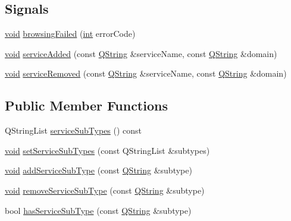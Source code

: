 \subsection*{Signals}
\begin{DoxyCompactItemize}
\item 
\hyperlink{group___u_a_v_objects_plugin_ga444cf2ff3f0ecbe028adce838d373f5c}{void} \hyperlink{class_qxt_service_browser_a64ae93186e3b3168753045325599be18}{browsing\-Failed} (\hyperlink{ioapi_8h_a787fa3cf048117ba7123753c1e74fcd6}{int} error\-Code)
\item 
\hyperlink{group___u_a_v_objects_plugin_ga444cf2ff3f0ecbe028adce838d373f5c}{void} \hyperlink{class_qxt_service_browser_a7ff617e438d9c31647c771bdcf32a6d3}{service\-Added} (const \hyperlink{group___u_a_v_objects_plugin_gab9d252f49c333c94a72f97ce3105a32d}{Q\-String} \&service\-Name, const \hyperlink{group___u_a_v_objects_plugin_gab9d252f49c333c94a72f97ce3105a32d}{Q\-String} \&domain)
\item 
\hyperlink{group___u_a_v_objects_plugin_ga444cf2ff3f0ecbe028adce838d373f5c}{void} \hyperlink{class_qxt_service_browser_a99c14f67893cd97ee134151711c56d50}{service\-Removed} (const \hyperlink{group___u_a_v_objects_plugin_gab9d252f49c333c94a72f97ce3105a32d}{Q\-String} \&service\-Name, const \hyperlink{group___u_a_v_objects_plugin_gab9d252f49c333c94a72f97ce3105a32d}{Q\-String} \&domain)
\end{DoxyCompactItemize}
\subsection*{Public Member Functions}
\begin{DoxyCompactItemize}
\item 
Q\-String\-List \hyperlink{class_qxt_service_browser_aa997db633abd90f54326fd4f1cb2764e}{service\-Sub\-Types} () const 
\item 
\hyperlink{group___u_a_v_objects_plugin_ga444cf2ff3f0ecbe028adce838d373f5c}{void} \hyperlink{class_qxt_service_browser_ad95a31fe11e7b3a5beb1d04cd885f935}{set\-Service\-Sub\-Types} (const Q\-String\-List \&subtypes)
\item 
\hyperlink{group___u_a_v_objects_plugin_ga444cf2ff3f0ecbe028adce838d373f5c}{void} \hyperlink{class_qxt_service_browser_a9c94d071f91d129602ce1e8ac4e52408}{add\-Service\-Sub\-Type} (const \hyperlink{group___u_a_v_objects_plugin_gab9d252f49c333c94a72f97ce3105a32d}{Q\-String} \&subtype)
\item 
\hyperlink{group___u_a_v_objects_plugin_ga444cf2ff3f0ecbe028adce838d373f5c}{void} \hyperlink{class_qxt_service_browser_aafa36805fde58b47418aea62c13160e5}{remove\-Service\-Sub\-Type} (const \hyperlink{group___u_a_v_objects_plugin_gab9d252f49c333c94a72f97ce3105a32d}{Q\-String} \&subtype)
\item 
bool \hyperlink{class_qxt_service_browser_ad6ff9641c42987a12f10be9bec14e855}{has\-Service\-Sub\-Type} (const \hyperlink{group___u_a_v_objects_plugin_gab9d252f49c333c94a72f97ce3105a32d}{Q\-String} \&subtype)
\end{DoxyCompactItemize}


